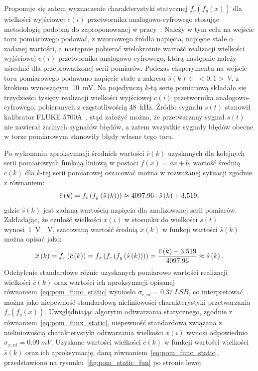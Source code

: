 Proponuje się zatem wyznaczenie charakterystyki statycznej $f_{c}(f_{y}(x))$ dla wielkości wyjściowej $c(i)$ przetwornika analogowo-cyfrowego stosując metodologię podobną do zaproponowanej w pracy~\cite{kampik_przetworniki}. Należy w tym celu na wejście toru pomiarowego podawać, z wzorcowego źródła napięcia, napięcie stałe o zadanej wartości, a następnie pobierać wielokrotnie wartość realizacji wielkości wyjściowej $c(i)$ przetwornika analogowo-cyfrowego, którą następnie należy uśrednić dla przeprowadzonej serii pomiarów. Podczas eksperymentu na wejście toru pomiarowego podawano napięcie stałe z zakresu $\hat{s}(k) \in~<0;1>~\unit{V}$, z krokiem wynoszącym~\qty{10}{mV}. Na pojedynczą $k$-tą serię pomiarową składało się trzydzieści tysięcy realizacji wielkości wyjściowej $c(i)$ przetwornika analogowo-cyfrowego, pobieranych z częstotliwością \qty{48}{kHz}. Źródło sygnału $s(t)$ stanowił kalibrator FLUKE 5700A~\cite{fluke_manual}, stąd założyć można, że przetwarzany sygnał $s(t)$ nie zawierał żadnych sygnałów błędów, a zatem wszystkie sygnały błędów obecne w torze pomiarowym stanowiły błędy własne tego toru.

Po wykonaniu aproksymacji średnich wartości $\overline{c}(k)$ uzyskanych dla kolejnych serii pomiarowych funkcją liniową w postaci $f(x) = ax + b$, wartość średnią $\overline{c}(k)$ dla $k$-tej serii pomiarowej oszacować można w rozważanej sytuacji zgodnie z równaniem:
\begin{equation}
\overline{c} \left(k\right) = f_{c} \left(f_{y} \left(\hat{s} \left(k\right)\right)\right) \approx 4097.96 \cdot \hat{s} \left(k\right) + 3.519 \label{eq:pom_func_static},
\end{equation}
gdzie $\hat{s}(k)$ jest zadaną wartością napięcia dla analizowanej serii pomiarów. Zakładając, że czułość wielkości $x(i)$ w stosunku do wielkości $s(t)$ wynosi~\qty{1}{V \per V}, szacowaną wartość średnią $\overline{x}(k)$ w funkcji wartości $\hat{s}(k)$ można opisać jako:
\begin{equation}
\overline{x} \left(k\right) = f_{x} \left(\overline{c} \left(k\right)\right) = f_{x} \left(f_{c} \left(f_{y} \left(\hat{s} \left(k\right)\right)\right)\right) = \frac{\overline{c} \left(k\right) - 3.519}{4097.96} \approx \hat{s} \left(k\right) \label{eq:pom_funx_static}.
\end{equation}
Odchylenie standardowe różnic uzyskanych pomiarowo wartości realizacji wielkości $\overline{c}(k)$ oraz wartości ich aproksymacji opisanej równaniem~\eqref{eq:pom_func_static} wyniosło $\sigma_{c,nl} = \qty{0.37}{LSB}$, co interpretować można jako niepewność standardową nieliniowości charakterystyki przetwarzania $f_{c}(f_{y}(x))$. Uwzględniając algorytm odtwarzania statycznego, zgodnie z równaniem~\eqref{eq:pom_funx_static}, niepewność standardowa związana z nieliniowością charakterystyki odtwarzania wielkości $x(i)$ wynosi odpowiednio $\sigma_{x,nl} = \qty{0.09}{mV}$. Uzyskane wartości wielkości $\overline{c}(k)$ w funkcji wartości wielkości $\hat{s}(k)$ oraz ich aproksymację, daną równaniem~\eqref{eq:pom_func_static}, przedstawiono na rysunku~\ref{fig:pom_static_fun} po stronie lewej.


